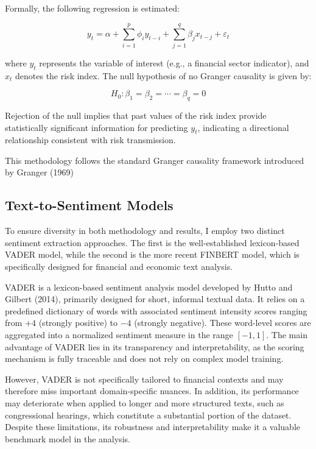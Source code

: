 \documentclass[12pt,a4paper]{report}\usepackage[a4paper, top=2.5cm, bottom=2.5cm, left=2.5cm, right=2.5cm]{geometry}
\begin{document}
Formally, the following regression is estimated:

\begin{equation}
y_t = \alpha + \sum_{i=1}^{p} \phi_i y_{t-i} + \sum_{j=1}^{q} \beta_j x_{t-j} + \varepsilon_t
\end{equation}

where \( y_t \) represents the variable of interest (e.g., a financial sector indicator), and 
\( x_t \) denotes the risk index. The null hypothesis of no Granger causality is given by:

\begin{equation}
H_0: \beta_1 = \beta_2 = \cdots = \beta_q = 0
\end{equation}

Rejection of the null implies that past values of the risk index provide statistically significant
information for predicting \( y_t \), indicating a directional relationship consistent with risk
transmission.

This methodology follows the standard Granger causality framework introduced by Granger (1969)

\subsection{Text-to-Sentiment Models}

To ensure diversity in both methodology and results, I employ two distinct sentiment extraction
approaches. The first is the well-established lexicon-based VADER model, while the second is the
more recent FINBERT model, which is specifically designed for financial and economic text analysis.

VADER is a lexicon-based sentiment analysis model developed by Hutto and Gilbert (2014), primarily
designed for short, informal textual data. It relies on a predefined dictionary of words with
associated sentiment intensity scores ranging from $+4$ (strongly positive) to $-4$ (strongly
negative). These word-level scores are aggregated into a normalized sentiment measure in the range
$[-1,1]$. The main advantage of VADER lies in its transparency and interpretability, as the scoring
mechanism is fully traceable and does not rely on complex model training.

However, VADER is not specifically tailored to financial contexts and may therefore miss important
domain-specific nuances. In addition, its performance may deteriorate when applied to longer and more
structured texts, such as congressional hearings, which constitute a substantial portion of the
dataset. Despite these limitations, its robustness and interpretability make it a valuable benchmark
model in the analysis.
\end{document}
